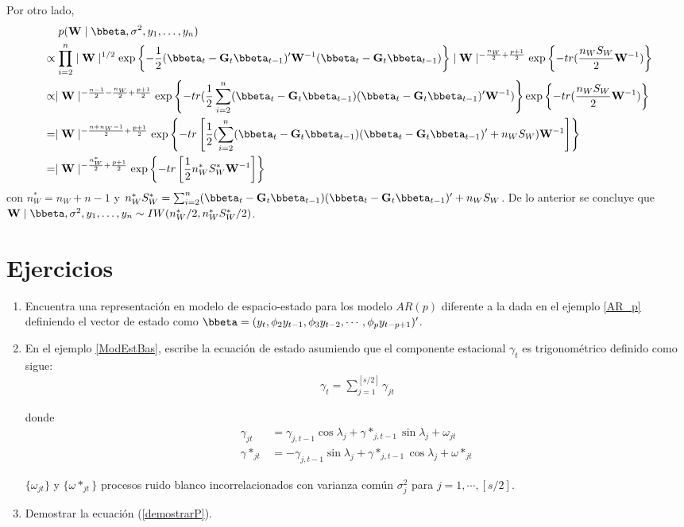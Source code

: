 Por otro lado,
\begin{align*}
&\ \ \ \ p(\mathbf{W} \mid \bbeta,\sigma^2,y_1,\ldots,y_n)\\
&\propto \prod_{i=2}^n \mid \mathbf{W} \mid ^{1/2}\exp\left\{-\frac{1}{2}(\bbeta_t-\mathbf{G}_t\bbeta_{t-1})'\mathbf{W}^{-1}(\bbeta_t-\mathbf{G}_t\bbeta_{t-1})\right\} \mid \mathbf{W} \mid ^{-\frac{n_W}{2}+\frac{p+1}{2}}\exp\left\{-tr(\frac{n_WS_W}{2}\mathbf{W}^{-1})\right\}\\
&\propto \mid \mathbf{W} \mid ^{-\frac{n-1}{2}-\frac{n_W}{2}+\frac{p+1}{2}}\exp\left\{-tr(\frac{1}{2}\sum_{i=2}^n (\bbeta_t-\mathbf{G}_t\bbeta_{t-1})(\bbeta_t-\mathbf{G}_t\bbeta_{t-1})'\mathbf{W}^{-1})\right\}\exp\left\{-tr(\frac{n_WS_W}{2}\mathbf{W}^{-1})\right\}\\
&= \mid \mathbf{W} \mid ^{-\frac{n+n_W-1}{2}+\frac{p+1}{2}}\exp\left\{-tr\left[\frac{1}{2}(\sum_{i=2}^n (\bbeta_t-\mathbf{G}_t\bbeta_{t-1})(\bbeta_t-\mathbf{G}_t\bbeta_{t-1})'+n_WS_W)\mathbf{W}^{-1}\right]\right\}\\
&= \mid \mathbf{W} \mid ^{-\frac{n_W^*}{2}+\frac{p+1}{2}}\exp\left\{-tr\left[\frac{1}{2}n_W^*S_W^*\mathbf{W}^{-1}\right]\right\}\\
\end{align*}
con $n_W^*=n_W+n-1$ y $n_W^*S_W^*=\sum_{i=2}^n (\bbeta_t-\mathbf{G}_t\bbeta_{t-1})(\bbeta_t-\mathbf{G}_t\bbeta_{t-1})'+n_WS_W$. De lo anterior se concluye que $\mathbf{W} \mid \bbeta,\sigma^2,y_1,\ldots,y_n\sim IW(n_W^*/2,n_W^*S_W^*/2)$.

\section{Ejercicios}
\begin{enumerate}
\item Encuentra una representación en modelo de espacio-estado para los modelo $AR(p)$ diferente a la dada en el ejemplo \ref{AR_p} definiendo el vector de estado como $\bbeta=(y_t,\phi_2y_{t-1},\phi_3y_{t-2},\cdots,\phi_py_{t-p+1})'$.
\item En el ejemplo \ref{ModEstBas}, escribe la ecuación de estado asumiendo que el componente estacional $\gamma_t$ es trigonométrico definido como sigue:
\begin{align*}
\gamma_t=\sum_{j=1}^{[s/2]}\gamma_{jt}
\end{align*}

donde
\begin{align*}
\gamma_{jt}&=\gamma_{j,t-1}\cos\lambda_j+\gamma*_{j,t-1}\sin\lambda_j+\omega_{jt}\\
\gamma*_{jt}&=-\gamma_{j,t-1}\sin\lambda_j+\gamma*_{j,t-1}\cos\lambda_j+\omega*_{jt}
\end{align*}

$\{\omega_{jt}\}$ y $\{\omega*_{jt}\}$ procesos ruido blanco incorrelacionados con varianza común $\sigma^2_j$ para $j=1,\cdots,[s/2]$.
\item Demostrar la ecuación (\ref{demostrarP}).
\end{enumerate}
